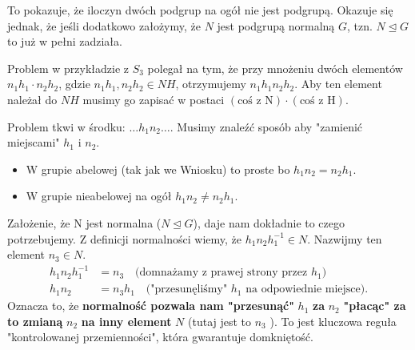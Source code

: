 To pokazuje, że iloczyn dwóch podgrup na ogół nie jest podgrupą. Okazuje się jednak, że jeśli dodatkowo założymy, że $N$ jest podgrupą normalną  $G$, tzn.  $N\unlhd G$ to już w pełni zadziała.

\begin{intuition}
	Problem w przykładzie z $S_3$ polegał na tym, że przy mnożeniu dwóch elementów $n_1h_1\cdot n_2h_2$, gdzie $n_1h_1, n_2h_2 \in NH$, otrzymujemy $n_1h_1n_2h_2$. Aby ten element należał do $NH$ musimy go zapisać w postaci  $\left( \text{coś z N} \right) \cdot \left( \text{coś z H} \right) $.

	Problem tkwi w środku: $\ldots h_1n_2 \ldots$. Musimy znaleźć sposób aby "zamienić miejscami" $h_1$ i $n_2$.
	\begin{itemize}
		\item W grupie abelowej (tak jak we Wniosku) to proste bo $h_1n_2 = n_2h_1$.
		\item W grupie nieabelowej na ogół $h_1n_2 \neq n_2h_1$.
	\end{itemize}

	Założenie, że N jest normalna ($N\unlhd G$), daje nam dokładnie to czego potrzebujemy. Z definicji normalności wiemy, że $h_1n_2h_1^{-1} \in N$. Nazwijmy ten element $n_3\in N$.
	\begin{align*}
		h_1n_2h_1^{-1} &= n_3\quad\text{(domnażamy z prawej strony przez $h_1$)} \\
		h_1n_2 &= n_3h_1\quad\text{("przesunęliśmy" $h_1$ na odpowiednie miejsce)}
	.\end{align*}
	Oznacza to, że \textbf{normalność pozwala nam "przesunąć"} $h_1$ \textbf{za} $n_2$ \textbf{"płacąc" za to zmianą } $n_2$  \textbf{na inny element } $N$ (tutaj jest to  $n_3$ ). To jest kluczowa reguła "kontrolowanej przemienności", która gwarantuje domkniętość.   
\end{intuition}
	
